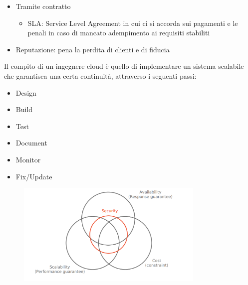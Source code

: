 \documentclass{article}
\begin{document}
		\begin{itemize}
		    \item Tramite contratto
		    \begin{itemize}
		        \item SLA: Service Level Agreement in cui ci si accorda sui pagamenti e le penali in caso di mancato adempimento ai requisiti stabiliti
		    \end{itemize}
		    \item Reputazione: pena la perdita di clienti e di fiducia
		\end{itemize}
		Il compito di un ingegnere cloud è quello di implementare un sistema scalabile che garantisca una certa continuità, attraverso i seguenti passi:
		
		\begin{itemize}
		    \item Design
		    \item Build
		    \item Test
		    \item Document
		    \item Monitor
		    \item Fix/Update
		
		\end{itemize}
		
		\begin{figure}[ht]
		\centering
		\includegraphics[width=0.8\textwidth]{SAC_01.png}
		\end{figure}
		
\end{document}
